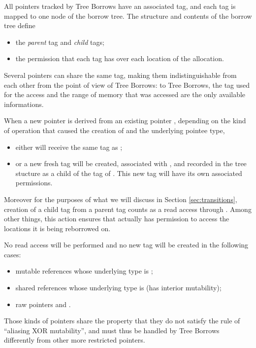 \documentclass[a4paper,11pt]{article}
\theoremstyle{plain}
\theoremstyle{definition}
\theoremstyle{remark}
\newcommand{\tcode}[1]{\rstinline{#1}}
\begin{document}
All pointers tracked by Tree Borrows have an associated tag, and each tag is
mapped to one node of the borrow tree. The structure and contents of the borrow tree
define
\begin{itemize}
    \item the \textit{parent} tag and \textit{child} tags;
    \item the permission that each tag has over each location of the allocation.
\end{itemize}

Several pointers can share the same tag, making them indistinguishable from each other
from the point of view of Tree Borrows: to Tree Borrows, the tag used for the access
and the range of memory that was accessed are the only available informations.

When a new pointer \tcode{y} is derived from an existing pointer \tcode{x}, depending
on the kind of operation that caused the creation of \tcode{y} and the underlying
pointee type,

\begin{itemize}
    \item either \tcode{y} will receive the same tag as \tcode{x};
    \item or a new fresh tag will be created, associated with \tcode{y}, and recorded in the
        tree stucture as a child of the tag of \tcode{x}. This new tag will have its own
        associated permissions.
\end{itemize}

Moreover for the purposes of what we will discuss in Section \ref{sec:transitions}, creation of
a child tag \tcode{y} from a parent tag \tcode{x} counts as a read access through \tcode{y}.
Among other things, this action ensures that \tcode{y} actually has permission to
access the locations it is being reborrowed on.

No read access will be performed and no new tag will be created in the following
cases:
\begin{itemize}
    \item mutable references \tcode{\&mut} whose underlying type is \tcode{!Unpin};
    \item shared references \tcode{\&} whose underlying type is \tcode{!Freeze} (has interior mutability);
    \item raw pointers \tcode{*mut} and \tcode{*const}.
\end{itemize}

Those kinds of pointers share the property that they do not satisfy the rule
of ``aliasing XOR mutability'', and must thus be handled by Tree Borrows differently
from other more restricted pointers.
\end{document}
